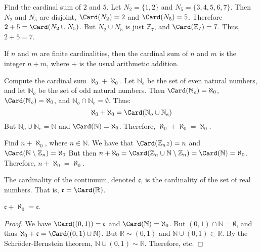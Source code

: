     \begin{example}
        Find the cardinal sum of $2$ and $5$. Let $N_{2}=\{1,2\}$ and
        $N_{5}=\{3,4,5,6,7\}$. Then $N_{2}$ and $N_{5}$ are disjoint,
        $\Card(N_{2})=2$ and $\Card(N_{5})=5$. Therefore
        $2+5=\Card(N_{2}\cup{N_{5}})$. But ${N_{2}}\cup{N_{5}}$ is just
        $\mathbb{Z}_{7}$, and $\Card(\mathbb{Z}_{7})=7$. Thus, $2+5=7$.
    \end{example}
    \begin{theorem}
        If $n$ and $m$ are finite cardinalities, then the cardinal sum of $n$
        and $m$ is the integer $n+m$, where $+$ is the usual arithmetic
        addition.
    \end{theorem}
    \begin{example}
        Compute the cardinal sum $\aleph_{0}+\aleph_{0}$. Let $\mathbb{N}_{e}$
        be the set of even natural numbers, and let $\mathbb{N}_{o}$ be the set
        of odd natural numbers. Then $\Card(\mathbb{N}_{e})=\aleph_{0}$,
        $\Card(\mathbb{N}_{o})=\aleph_{0}$, and
        ${\mathbb{N}_{o}}\cap{\mathbb{N}_{e}}=\emptyset$. Thus:
        \begin{equation}
            \aleph_{0}+\aleph_{0}=\Card({\mathbb{N}_{o}}\cup{\mathbb{N}_{e}})
        \end{equation}
        But ${\mathbb{N}_{o}}\cup{\mathbb{N}_{e}}=\mathbb{N}$ and
        $\Card(\mathbb{N})=\aleph_{0}$. Therefore,
        $\aleph_{0}+\aleph_{0}=\aleph_{0}$.
    \end{example}
    \begin{example}
        Find $n+\aleph_{0}$, where $n\in\mathbb{N}$. We have that
        $\Card(\mathbb{Z}_{n}z)=n$ and
        $\Card(\mathbb{N}\setminus\mathbb{Z}_{n})=\aleph_{0}$
        But then
        $n+\aleph_{0}=\Card(\mathbb{Z}_{n}\cup%
         \mathbb{N}\setminus\mathbb{Z}_{n})=\Card(\mathbb{N})=\aleph_{0}$.
        Therefore, $n+\aleph_{0}=\aleph_{0}$.
    \end{example}
    \begin{definition}
        The cardinality of the continuum, denoted $\mathfrak{c}$, is the
        cardinality of the set of real numbers. That is,
        $\mathfrak{c}=\Card(\mathbb{R})$.
    \end{definition}
    \begin{theorem}
        $\mathfrak{c}+\aleph_{0}=\mathfrak{c}$.
    \end{theorem}
    \begin{proof}
        We have $\Card((0,1))=\mathfrak{c}$ and $\Card(\mathbb{N})=\aleph_{0}$.
        But $(0,1)\cap\mathbb{N}=\emptyset$, and thus
        $\aleph_{0}+\mathfrak{c}=\Card((0,1)\cup\mathbb{N})$.
        But $\mathbb{R}\sim(0,1)$ and $\mathbb{N}\cup(0,1)\subset\mathbb{R}$. By
        the Schr\"{o}der-Bernstein theorem, $\mathbb{N}\cup(0,1)\sim\mathbb{R}$.
        Therefore, etc.
    \end{proof}
